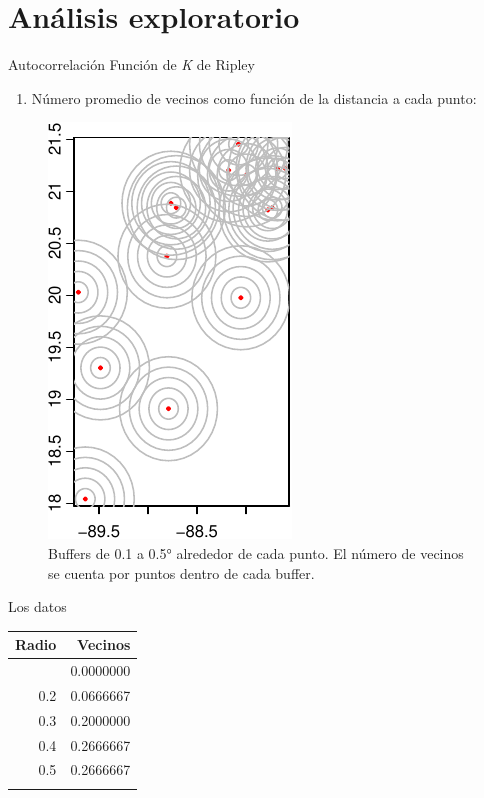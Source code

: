 \documentclass[
  11pt,
  ignorenonframetext,
]{beamer}
\providecommand{\tightlist}{%
  \setlength{\itemsep}{0pt}\setlength{\parskip}{0pt}}
\begin{document}
\hypertarget{anuxe1lisis-exploratorio}{%
\section{Análisis exploratorio}\label{anuxe1lisis-exploratorio}}

\begin{frame}{Autocorrelación}
\protect\hypertarget{autocorrelaciuxf3n}{}
Función de \emph{K} de Ripley

\begin{enumerate}
\tightlist
\item
  Número promedio de vecinos como función de la distancia a cada punto:
\end{enumerate}

\begin{figure}

{\centering \includegraphics{Tutorial-spatstat-2_files/figure-beamer/unnamed-chunk-6-1} 

}

\caption{Buffers  de 0.1 a 0.5° alrededor de cada punto. El número de vecinos se cuenta por puntos dentro de cada buffer.}\label{fig:unnamed-chunk-6}
\end{figure}
\end{frame}

\begin{frame}{Los datos}
\protect\hypertarget{los-datos}{}
\begin{longtable}[]{@{}rr@{}}
\toprule\noalign{}
Radio & Vecinos \\
\midrule\noalign{}
\endhead
0.1 & 0.0000000 \\
0.2 & 0.0666667 \\
0.3 & 0.2000000 \\
0.4 & 0.2666667 \\
0.5 & 0.2666667 \\
\bottomrule\noalign{}
\end{longtable}
\end{frame}
\end{document}

